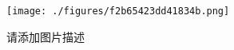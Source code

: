 
\begin{figure}[ht]
\centering
\texttt{[image: ./figures/f2b65423dd41834b.png]}
\caption{请添加图片描述} \label{fig_test6_3}
\end{figure}
